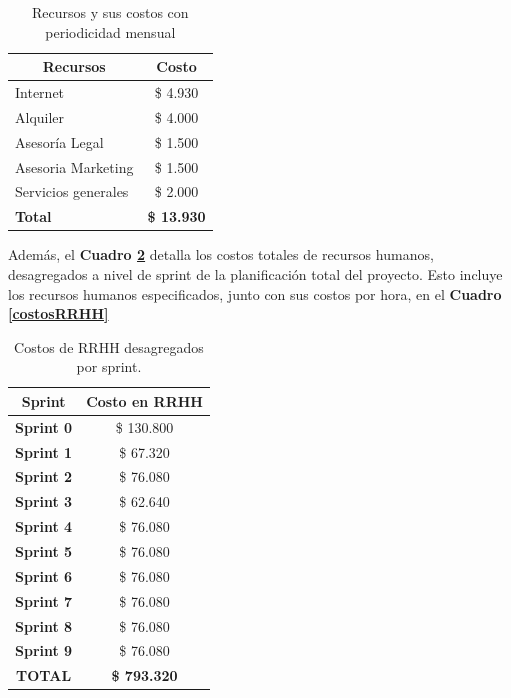 \begin{table}[h]
\centering
\begin{tabular}{|l|c|}
\hline
\multicolumn{1}{|c|}{{\bf Recursos}} & {\bf Costo}      \\ \hline
Internet                             & \$ 4.930         \\ \hline
Alquiler                             & \$ 4.000         \\ \hline
Asesoría Legal                       & \$ 1.500         \\ \hline
Asesoria Marketing                   & \$ 1.500         \\ \hline
Servicios generales                  & \$ 2.000         \\ \hline
{\bf Total}                          & {\bf \$ 13.930}  \\ \hline
\end{tabular}
\caption{Recursos y sus costos con periodicidad mensual}
\label{recursos_mensuales}
\end{table}

Además, el \textbf{Cuadro \ref{costos-sprint}} detalla los costos totales de recursos humanos, desagregados a nivel de sprint de la planificación total del proyecto.
Esto incluye los recursos humanos especificados, junto con sus costos por hora, en el \textbf{Cuadro \ref{costosRRHH}}

\begin{table}[h]
\centering
\begin{tabular}{|c|c|}
\hline
{\bf Sprint}   & {\bf Costo en RRHH} \\ \hline
{\bf Sprint 0} & \$ 130.800          \\ \hline
{\bf Sprint 1} & \$ 67.320           \\ \hline
{\bf Sprint 2} & \$ 76.080           \\ \hline
{\bf Sprint 3} & \$ 62.640           \\ \hline
{\bf Sprint 4} & \$ 76.080           \\ \hline
{\bf Sprint 5} & \$ 76.080           \\ \hline
{\bf Sprint 6} & \$ 76.080           \\ \hline
{\bf Sprint 7} & \$ 76.080           \\ \hline
{\bf Sprint 8} & \$ 76.080           \\ \hline
{\bf Sprint 9} & \$ 76.080           \\ \hline
{\bf TOTAL}    & {\bf \$ 793.320}    \\ \hline
\end{tabular}
\caption{Costos de RRHH desagregados por sprint.}
\label{costos-sprint}
\end{table}

